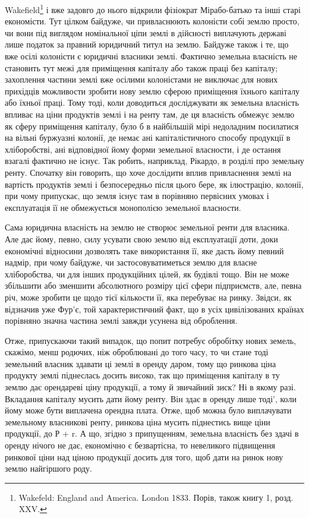 Wakefield\footnote{
Wakefeld: England and America. London 1833. Порів, також книгу 1, розд. XXV.
} і вже задовго до нього відкрили фізіократ Мірабо-батько та інші
старі економісти. Тут цілком байдуже, чи привласнюють колоністи собі землю
просто, чи вони під виглядом номінальної ціпи землі в дійсності виплачують державі
лише податок за правний юридичний титул на землю. Байдуже також і те, що вже
осілі колоністи є юридичні власники землі. Фактично земельна власність не
становить тут межі для приміщення капіталу або також праці без капіталу;
захоплення частини землі вже осілими колоністами не виключає для нових
прихідців можливости зробити нову землю сферою приміщення їхнього капіталу
або їхньої праці. Тому тоді, коли доводиться досліджувати як земельна власність
впливає на ціни продуктів землі і на ренту там, де ця власність обмежує
землю як сферу приміщення капіталу, було б в найбільшій мірі недоладним
посилатися на вільні буржуазні колонії, де немає ані капіталістичного способу
продукції в хліборобстві, ані відповідної йому форми земельної власности, і де
остання взагалі фактично не існує. Так робить, наприклад, Рікардо, в розділі
про земельну ренту. Спочатку він говорить, що хоче дослідити вплив привласнення
землі на вартість продуктів землі і безпосередньо після цього бере, як
ілюстрацію, колонії, при чому припускає, що земля існує там в порівняно
первісних умовах і експлуатація її не обмежується монополією земельної
власности.

Сама юридична власність на землю не створює земельної ренти для власника.
Але дає йому, певно, силу усувати свою землю від експлуатації доти,
доки економічні відносини дозволять таке використання її, яке дасть йому
певний надмір, при чому байдуже, чи застосовуватиметься землю для власне
хліборобства, чи для інших продукційних цілей, як будівлі тощо. Він не може
збільшити або зменшити абсолютного розміру цієї сфери підприємств, але, певна
річ, може зробити це щодо тієї кількости її, яка перебуває на ринку. Звідси,
як відзначив уже Фур’є, той характеристичний факт, що в усіх цивілізованих
країнах порівняно значна частина землі завжди усунена від оброблення.

Отже, припускаючи такий випадок, що попит потребує обробітку нових
земель, скажімо, менш родючих, ніж оброблювані до того часу, то чи стане
тоді земельний власник здавати ці землі в оренду даром, тому що ринкова
ціна продукту землі піднеслась досить високо, так що приміщення капіталу
в ту землю дає орендареві ціну продукції, а тому й звичайний зиск? Ні в якому
разі. Вкладання капіталу мусить дати йому ренту. Він здає в оренду лише тоді',
коли йому може бути виплачена орендна плата. Отже, щоб можна було виплачувати
земельному власникові ренту, ринкова ціна мусить піднестись вище
ціни продукції, до Р + r. А що, згідно з припущенням, земельна власність
без здачі в оренду нічого не дає, економічно є безвартісна, то невеликого підвищення
ринкової ціни над ціною продукції досить для того, щоб дати на ринок
нову землю найгіршого роду.

